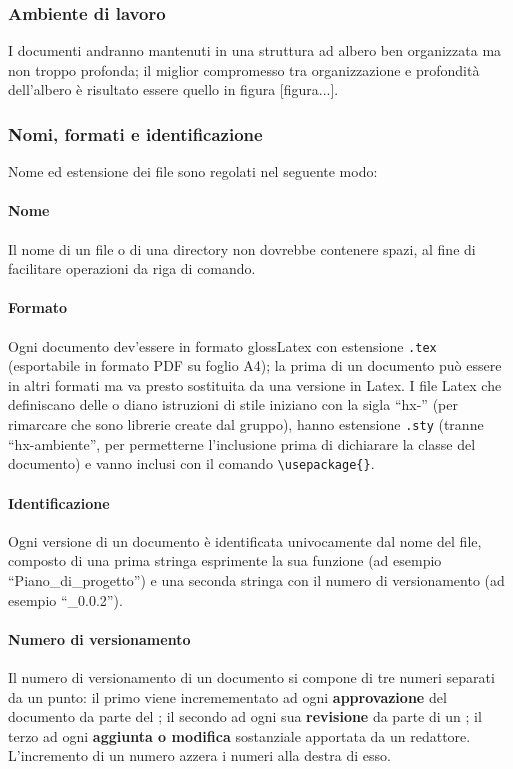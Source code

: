 \subsubsection{Ambiente di lavoro} I documenti andranno mantenuti in una struttura ad albero ben organizzata ma non troppo profonda; il miglior compromesso tra organizzazione e profondità dell'albero è risultato essere quello in figura [figura...].

\subsubsection{Nomi, formati e identificazione} Nome ed estensione dei file sono regolati nel seguente modo:
\paragraph{Nome} Il nome di un file o di una directory non dovrebbe contenere spazi, al fine di facilitare operazioni da riga di comando.
\paragraph{Formato} Ogni documento dev'essere in formato gloss{Latex} con estensione \texttt{.tex} (esportabile in formato PDF su foglio A4); la prima  di un documento può essere in altri formati ma va presto sostituita da una versione in Latex. I file Latex che definiscano delle  o diano istruzioni di stile iniziano con la sigla “hx-” (per rimarcare che sono librerie create dal gruppo), hanno estensione \texttt{.sty} (tranne “hx-ambiente”, per permetterne l'inclusione prima di dichiarare la classe del documento) e vanno inclusi con il comando \texttt{\textbackslash usepackage\{\}}.
\paragraph{Identificazione} Ogni versione di un documento è identificata univocamente dal nome del file, composto di una prima stringa esprimente la sua funzione (ad esempio “Piano\_di\_progetto”) e una seconda stringa con il numero di versionamento (ad esempio “\_0.0.2”).
\paragraph{Numero di versionamento} Il numero di versionamento di un documento si compone di tre numeri separati da un punto: il primo viene incremementato ad ogni \textbf{approvazione} del documento da parte del ; il secondo ad ogni sua \textbf{revisione} da parte di un ; il terzo ad ogni \textbf{aggiunta o modifica} sostanziale apportata da un redattore. L'incremento di un numero azzera i numeri alla destra di esso.

